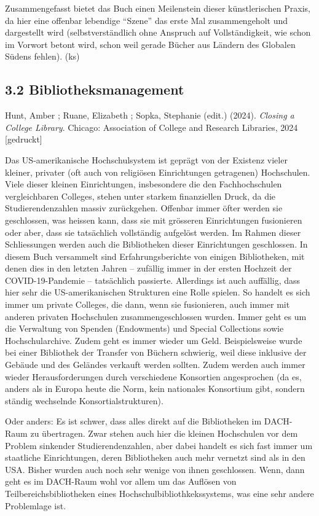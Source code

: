\documentclass[a4paper,
fontsize=11pt,
oneside,
numbers=noperiodatend,
parskip=half-,
bibliography=totoc,
final
]{scrartcl}
\begin{document}
Zusammengefasst bietet das Buch einen Meilenstein dieser künstlerischen
Praxis, da hier eine offenbar lebendige \enquote{Szene} das erste Mal
zusammengeholt und dargestellt wird (selbstverständlich ohne Anspruch
auf Vollständigkeit, wie schon im Vorwort betont wird, schon weil gerade
Bücher aus Ländern des Globalen Südens fehlen). (ks)

\subsection{3.2 Bibliotheksmanagement}\label{bibliotheksmanagement}

Hunt, Amber ; Ruane, Elizabeth ; Sopka, Stephanie (edit.) (2024).
\emph{Closing a College Library}. Chicago: Association of College and
Research Libraries, 2024 {[}gedruckt{]}

Das US-amerikanische Hochschulsystem ist geprägt von der Existenz vieler
kleiner, privater (oft auch von religiösen Einrichtungen getragenen)
Hochschulen. Viele dieser kleinen Einrichtungen, insbesondere die den
Fachhochschulen vergleichbaren Colleges, stehen unter starkem
finanziellen Druck, da die Studierendenzahlen massiv zurückgehen.
Offenbar immer öfter werden sie geschlossen, was heissen kann, dass sie
mit grösseren Einrichtungen fusionieren oder aber, dass sie tatsächlich
vollständig aufgelöst werden. Im Rahmen dieser Schliessungen werden auch
die Bibliotheken dieser Einrichtungen geschlossen. In diesem Buch
versammelt sind Erfahrungsberichte von einigen Bibliotheken, mit denen
dies in den letzten Jahren -- zufällig immer in der ersten Hochzeit der
COVID-19-Pandemie -- tatsächlich passierte. Allerdings ist auch
auffällig, dass hier sehr die US-amerikanischen Strukturen eine Rolle
spielen. So handelt es sich immer um private Colleges, die dann, wenn
sie fusionieren, auch immer mit anderen privaten Hochschulen
zusammengeschlossen wurden. Immer geht es um die Verwaltung von Spenden
(Endowments) und Special Collections sowie Hochschularchive. Zudem geht
es immer wieder um Geld. Beispielsweise wurde bei einer Bibliothek der
Transfer von Büchern schwierig, weil diese inklusive der Gebäude und des
Geländes verkauft werden sollten. Zudem werden auch immer wieder
Herausforderungen durch verschiedene Konsortien angesprochen (da es,
anders als in Europa heute die Norm, kein nationales Konsortium gibt,
sondern ständig wechselnde Konsortialstrukturen).

Oder anders: Es ist schwer, dass alles direkt auf die Bibliotheken im
DACH-Raum zu übertragen. Zwar stehen auch hier die kleinen Hochschulen
vor dem Problem sinkender Studierendenzahlen, aber dabei handelt es sich
fast immer um staatliche Einrichtungen, deren Bibliotheken auch mehr
vernetzt sind als in den USA. Bisher wurden auch noch sehr wenige von
ihnen geschlossen. Wenn, dann geht es im DACH-Raum wohl vor allem um das
Auflösen von Teilbereichsbibliotheken eines
Hochschulbibliothkekssystems, was eine sehr andere Problemlage ist.
\end{document}
